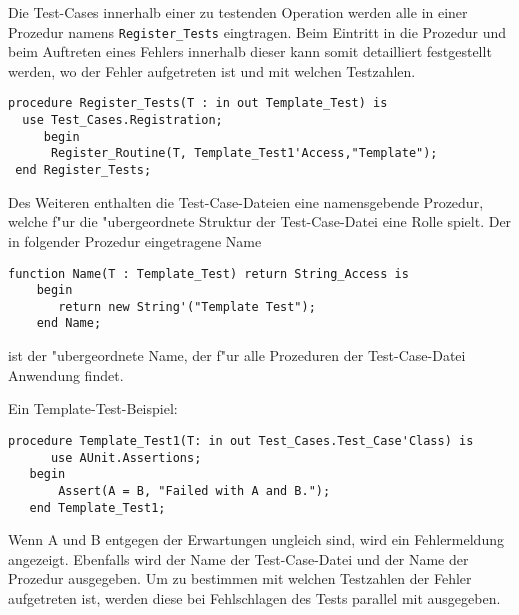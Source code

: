Die Test-Cases innerhalb einer zu testenden Operation werden alle in
einer Prozedur namens {\tt Register\_Tests} eingtragen.  Beim Eintritt
in die Prozedur und beim Auftreten eines Fehlers innerhalb dieser kann
somit detailliert festgestellt werden, wo der Fehler aufgetreten ist
und mit welchen Testzahlen.

\begin{lstlisting}
procedure Register_Tests(T : in out Template_Test) is
  use Test_Cases.Registration;
     begin
      Register_Routine(T, Template_Test1'Access,"Template");
 end Register_Tests;
\end{lstlisting}

Des Weiteren enthalten die Test-Case-Dateien eine namensgebende
Prozedur, welche f"ur die "ubergeordnete Struktur der Test-Case-Datei
eine Rolle spielt.  Der in folgender Prozedur eingetragene Name

\begin{lstlisting}
function Name(T : Template_Test) return String_Access is
	begin
	   return new String'("Template Test");
	end Name;
\end{lstlisting}

ist der "ubergeordnete Name, der f"ur alle Prozeduren der
Test-Case-Datei Anwendung findet.

Ein Template-Test-Beispiel:
\begin{lstlisting}
procedure Template_Test1(T: in out Test_Cases.Test_Case'Class) is
      use AUnit.Assertions; 
   begin      
       Assert(A = B, "Failed with A and B.");
   end Template_Test1;
\end{lstlisting}

Wenn A und B entgegen der Erwartungen ungleich sind, wird ein
Fehlermeldung angezeigt. Ebenfalls wird der Name der Test-Case-Datei
und der Name der Prozedur ausgegeben.  Um zu bestimmen mit welchen
Testzahlen der Fehler aufgetreten ist, werden diese bei Fehlschlagen
des Tests parallel mit ausgegeben.

